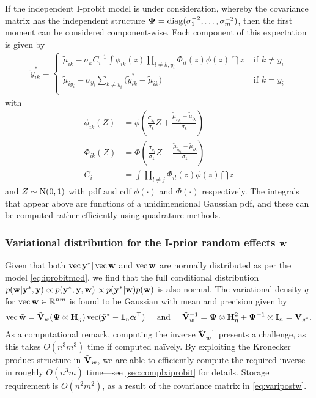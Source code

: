 If the independent I-probit model is under consideration, whereby the covariance matrix has the independent structure ${\bm\Psi} = \operatorname{diag}(\sigma_1^{-2},\dots,\sigma_m^{-2})$, then the first moment  can be considered component-wise. 
Each component of this expectation is given by
\begin{align}\label{eq:ystarupdate}
  \tilde y_{ik}^* =
  \begin{cases}
    \tilde\mu_{ik} - \sigma_k C_i^{-1} \displaystyle{  \int \phi_{ik}(z) \prod_{l \neq k,y_i} \Phi_{il}(z) \phi(z) \dint z }
    &\text{ if } k \neq y_i \\[1.5em]
    \tilde\mu_{iy_i} - \sigma_{y_i} \sum_{k \neq y_i} \big(\tilde y_{ik}^* -  \tilde\mu_{ik} \big) 
    &\text{ if } k = y_i \\
  \end{cases}
\end{align}
with 
\vspace{-1em}
\begin{align*}
  \phi_{ik}(Z) &= \phi \left(\frac{\sigma_{y_i}}{\sigma_k} Z + \frac{\tilde\mu_{iy_i} - \tilde\mu_{ik}}{\sigma_k} \right) \\
  \Phi_{ik}(Z) &= \Phi \left(\frac{\sigma_{y_i}}{\sigma_k} Z + \frac{\tilde\mu_{iy_i} - \tilde\mu_{ik}}{\sigma_k} \right) \\
  C_i &= \int \prod_{l \neq j} \Phi_{il}(z) \phi(z) \dint z
\end{align*}
and $Z \sim \operatorname{N}(0,1)$ with pdf and cdf $\phi(\cdot)$ and $\Phi(\cdot)$ respectively. 
The integrals that appear above are functions of a unidimensional Gaussian pdf, and these can be computed rather efficiently using quadrature methods.

\subsubsection{Variational distribution for the I-prior random effects \texorpdfstring{${\mathbf w}$}{$w$}}

Given that both $\operatorname{vec} {\mathbf y}^* | \operatorname{vec} {\mathbf w}$ and $\operatorname{vec}{\mathbf w}$ are normally distributed as per the model \cref{eq:iprobitmod}, we find that the full conditional distribution $p({\mathbf w}|{\mathbf y}^*,{\mathbf y}) \propto p({\mathbf y}^*,{\mathbf y},{\mathbf w}) \propto p({\mathbf y}^*|{\mathbf w})p({\mathbf w})$ is also normal. 
The variational density $q$ for $\operatorname{vec} {\mathbf w} \in \mathbb{R}^{nm}$ is found to be Gaussian with mean and precision given by
\begin{gather}\label{eq:varipostw}
   \operatorname{vec} \tilde{{\mathbf w}} = \tilde{{\mathbf V}}_w 
    ({\bm\Psi} \otimes {\mathbf H}_\eta) \operatorname{vec} (\tilde{{\mathbf y}}^* - {\mathbf 1}_n{\bm\alpha}^\top)
  \hspace{0.5cm}\text{and}\hspace{0.5cm} 
  \tilde {{\mathbf V}}_w^{-1} = {\bm\Psi} \otimes {\mathbf H}_\eta^2 + {\bm\Psi}^{-1} \otimes {\mathbf I}_n = {\mathbf V}_{y^*}.
\end{gather}
As a computational remark, computing the inverse $\tilde{{\mathbf V}}_w^{-1}$ presents a challenge, as this takes $O(n^3m^3)$ time if computed naïvely. 
By exploiting the Kronecker product structure in $\tilde{{\mathbf V}}_w$, we are able to efficiently compute the required inverse in roughly $O(n^3m)$ time---see \cref{sec:complxiprobit} for details.
Storage requirement is $O(n^2m^2)$, as a result of the covariance matrix in \cref{eq:varipostw}.

